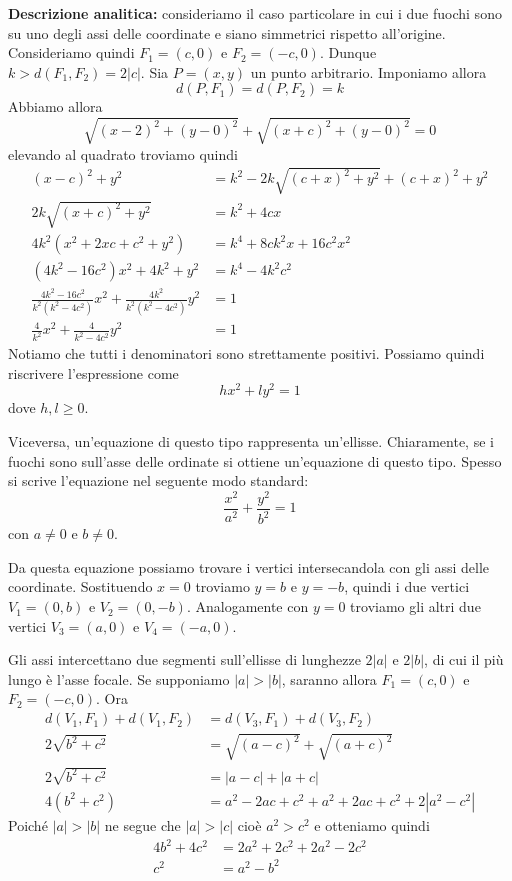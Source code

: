 \documentclass[a4paper]{article}
\begin{document}
\textbf{Descrizione analitica:} consideriamo il caso particolare in cui i due fuochi sono
su uno degli assi delle coordinate e siano simmetrici rispetto all'origine.
Consideriamo quindi \(F_1=(c,0)\) e \(F_2 = (-c,0)\).
Dunque \(k > d(F_1, F_2) = 2|c|\).
Sia \(P=(x,y)\) un punto arbitrario. Imponiamo allora
\[ d(P, F_1) = d(P, F_2) = k \]
Abbiamo allora
\[ \sqrt{{(x-2)}^2 + {(y-0)}^2} + \sqrt{{(x+c)}^2 + {(y-0)}^2} = 0 \]
elevando al quadrato troviamo quindi
\begin{align*}
    {(x-c)}^2 + y^2 &= k^2 - 2k\sqrt{{(c+x)}^2 + y^2} + {(c+x)}^2 + y^2 \\
    2k\sqrt{{(x+c)}^2 + y^2} &= k^2 + 4cx \\
    4k^2 ( x^2 + 2xc + c^2 + y^2) &= k^4 + 8ck^2x + 16c^2x^2 \\
    (4k^2 - 16c^2)x^2 + 4k^2 + y^2 &= k^4 - 4k^2c^2 \\
    \frac{4k^2 - 16c^2}{k^2(k^2 - 4c^2)} x^2 + \frac{4k^2}{k^2(k^2-4c^2)}y^2 &= 1 \\
    \frac{4}{k^2}x^2 + \frac{4}{k^2 - 4c^2}y^2 &= 1
\end{align*}
Notiamo che tutti i denominatori sono strettamente positivi.
Possiamo quindi riscrivere l'espressione come
\[
    hx^2 + ly^2 = 1
\]
dove \(h,l \geq 0\).

Viceversa, un'equazione di questo tipo rappresenta un'ellisse.
Chiaramente, se i fuochi sono sull'asse delle ordinate si ottiene un'equazione di questo tipo.
Spesso si scrive l'equazione nel seguente modo standard:
\[
    \frac{x^2}{a^2} + \frac{y^2}{b^2} = 1
\]
con \(a\neq 0\) e \(b \neq 0\).

Da questa equazione possiamo trovare i vertici intersecandola con gli assi delle coordinate.
Sostituendo \(x=0\) troviamo \(y=b\) e \(y=-b\), quindi i due vertici \(V_1 = (0,b)\) e \(V_2 = (0,-b)\).
Analogamente con \(y=0\) troviamo gli altri due vertici \(V_3=(a,0)\) e \(V_4=(-a,0)\).

Gli assi intercettano due segmenti sull'ellisse di lunghezze \(2|a|\) e \(2|b|\),
di cui il più lungo è l'asse focale.
Se supponiamo \(|a| > |b|\), saranno allora
\(F_1=(c,0)\) e \(F_2=(-c,0)\).
Ora
\begin{align*}
    d(V_1, F_1) + d(V_1, F_2) &= d(V_3, F_1) + d(V_3, F_2) \\
    2\sqrt{b^2 + c^2} &= \sqrt{{(a-c)}^2} + \sqrt{{(a+c)}^2} \\
    2\sqrt{b^2 + c^2} &= |a-c| + |a+c| \\
    4(b^2 + c^2) &= a^2 - 2ac + c^2 + a^2 + 2ac + c^2 + 2|a^2 - c^2|
\end{align*}
Poiché \(|a| > |b|\) ne segue che \(|a| > |c|\) cioè \(a^2 > c^2\) e otteniamo quindi
\begin{align*}
    4b^2 + 4c^2 &= 2a^2 +2c^2 + 2a^2 - 2c^2 \\
    c^2 &= a^2 - b^2
\end{align*}
\end{document}

